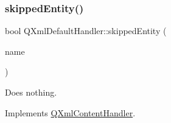\mbox{\label{class_q_xml_default_handler_a8c02fbe04d75e0ac50202f21e101e5c9}} 
\subsubsection{\texorpdfstring{skippedEntity()}{skippedEntity()}}
{\footnotesize\ttfamily bool Q\+Xml\+Default\+Handler\+::skipped\+Entity (\begin{DoxyParamCaption}\item[{const \mbox{\hyperlink{class_q_string}{Q\+String}} \&}]{name }\end{DoxyParamCaption})\hspace{0.3cm}{\ttfamily [virtual]}}

Does nothing. 

Implements \mbox{\hyperlink{class_q_xml_content_handler_ac3b27d569634c5d7a7fac001a6cc4845}{Q\+Xml\+Content\+Handler}}.



